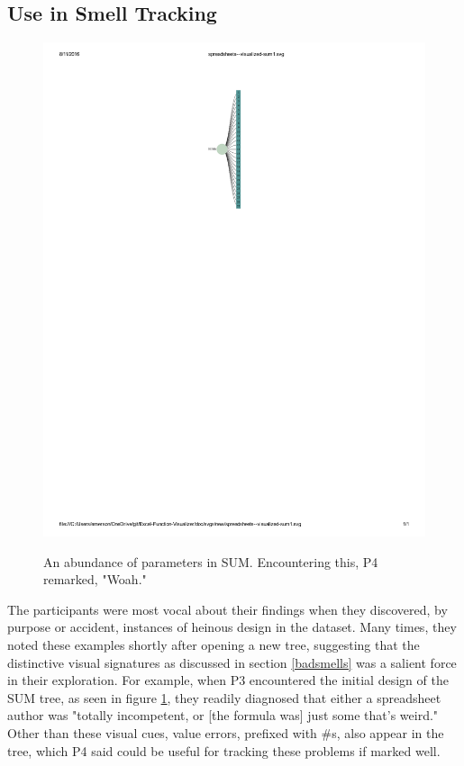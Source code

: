 \documentclass[conference]{IEEEtran}
\begin{document}
	\subsection{Use in Smell Tracking}
	\begin{figure} \centering \includegraphics{SUM}
		\label{fig:sum} \caption{An abundance of parameters in SUM. Encountering this, P4
			remarked, "Woah."} \end{figure}
	
	The participants were most vocal about their findings when they discovered, by
	purpose or accident, instances of heinous design in the dataset. Many times,
	they noted these examples shortly after opening a new tree, suggesting that the
	distinctive visual signatures as discussed in section \ref{badsmells} was a
	salient force in their exploration. For example, when P3 encountered the
	initial design of the SUM tree, as seen in figure \ref{fig:sum}, they readily
	diagnosed that either a spreadsheet author was "totally incompetent, or [the
	formula was] just some that's weird." Other than these visual cues, value
	errors, prefixed with \#s, also appear in the tree, 
	which P4 said could be useful for tracking these problems if marked well.
	
\end{document}
